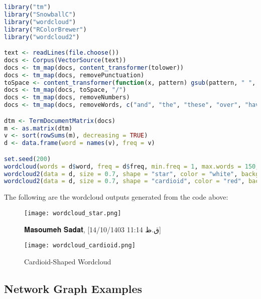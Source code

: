 \documentclass{article}
\begin{document}
\begin{lstlisting}[language=R]
library("tm")
library("SnowballC")
library("wordcloud")
library("RColorBrewer")
library("wordcloud2")

text <- readLines(file.choose())
docs <- Corpus(VectorSource(text))
docs <- tm_map(docs, content_transformer(tolower))
docs <- tm_map(docs, removePunctuation)
toSpace <- content_transformer(function(x, pattern) gsub(pattern, " ", x))
docs <- tm_map(docs, toSpace, "/")
docs <- tm_map(docs, removeNumbers)
docs <- tm_map(docs, removeWords, c("and", "the", "these", "over", "have", "also", "one", "are", "for", "that", "can", "all", "with", "has", "froms", "from"))

dtm <- TermDocumentMatrix(docs)
m <- as.matrix(dtm)
v <- sort(rowSums(m), decreasing = TRUE)
d <- data.frame(word = names(v), freq = v)

set.seed(200)
wordcloud(words = d$word, freq = d$freq, min.freq = 1, max.words = 150, random.order = FALSE, rot.per = 0.5, colors = brewer.pal(8, "Dark2"))
wordcloud2(data = d, size = 0.7, shape = "star", color = "white", backgroundColor = "blue", minRotation = -pi/6, maxRotation = -pi/6, rotateRatio = 0)
wordcloud2(data = d, size = 0.7, shape = "cardioid", color = "red", backgroundColor = "white", minRotation = -pi/6, maxRotation = -pi/6, rotateRatio = 1)
\end{lstlisting}

The following are the wordcloud outputs generated from the code above:

\begin{figure}[h!]
  \centering
  \begin{minipage}{0.45\textwidth}
    \centering
    \texttt{[image: wordcloud\_star.png]} %
    \caption{Star-Shaped Wordcloud}
    \label{fig:wordcloud_star}
  \end{minipage} \hfill

𝐌𝐚𝐬𝐨𝐮𝐦𝐞𝐡 𝐒𝐚𝐝𝐚𝐭, [14/10/1403 11:14 ق.ظ]
\begin{minipage}{0.45\textwidth}
    \centering
    \texttt{[image: wordcloud\_cardioid.png]} %
    \caption{Cardioid-Shaped Wordcloud}
    \label{fig:wordcloud_cardioid}
  \end{minipage}
\end{figure}

\newpage

\subsection*{Network Graph Examples}
\end{document}
